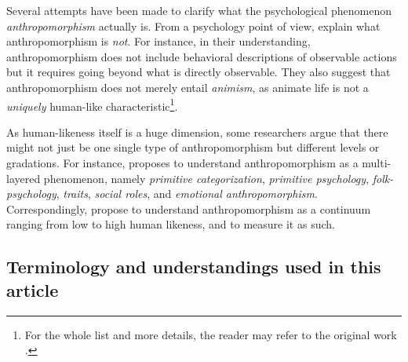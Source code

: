 \documentclass{frontiersSCNS} %
\begin{document}
Several attempts have been made to clarify what the psychological phenomenon
\emph{anthropomorphism} actually is.  From a psychology point of view,
\citet{epley_when_2008} explain what anthropomorphism is \textit{not}. For
instance, in their understanding, anthropomorphism does not include behavioral
descriptions of observable actions but it requires going beyond what is directly
observable. They also suggest that anthropomorphism does not merely entail
\textit{animism}, as animate life is not a \textit{uniquely} human-like
characteristic\footnote{For the whole list and more details, the reader may
refer to the original work \citep{epley_when_2008}.}.




As human-likeness itself is a huge dimension,
some researchers argue that there might not just be one single type of
anthropomorphism but different levels or gradations. For instance,
\citet{persson_anthropomorphism_2000} proposes to understand anthropomorphism as
a multi-layered phenomenon, namely \emph{primitive categorization},
\emph{primitive psychology}, \emph{folk-psychology}, \emph{traits}, \emph{social
roles}, and \emph{emotional anthropomorphism}. Correspondingly,
\citet{ruijten_introducing_2014} propose to understand anthropomorphism as a
continuum ranging from low to high human likeness, and to measure it as such.


\subsection{Terminology and understandings used in this article}
\end{document}
